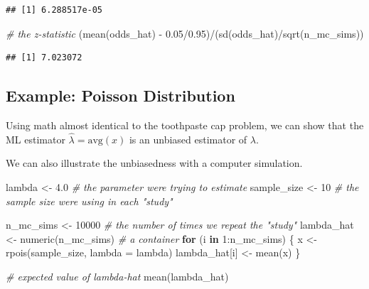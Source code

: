 \documentclass[
]{book}
\newenvironment{Shaded}{\begin{snugshade}}{\end{snugshade}}
\newcommand{\AttributeTok}[1]{\textcolor[rgb]{0.77,0.63,0.00}{#1}}
\newcommand{\CommentTok}[1]{\textcolor[rgb]{0.56,0.35,0.01}{\textit{#1}}}
\newcommand{\ControlFlowTok}[1]{\textcolor[rgb]{0.13,0.29,0.53}{\textbf{#1}}}
\newcommand{\DecValTok}[1]{\textcolor[rgb]{0.00,0.00,0.81}{#1}}
\newcommand{\FloatTok}[1]{\textcolor[rgb]{0.00,0.00,0.81}{#1}}
\newcommand{\FunctionTok}[1]{\textcolor[rgb]{0.00,0.00,0.00}{#1}}
\newcommand{\NormalTok}[1]{#1}
\newcommand{\OtherTok}[1]{\textcolor[rgb]{0.56,0.35,0.01}{#1}}
\newcommand{\SpecialCharTok}[1]{\textcolor[rgb]{0.00,0.00,0.00}{#1}}
\begin{document}
\begin{verbatim}
## [1] 6.288517e-05
\end{verbatim}

\begin{Shaded}
\begin{Highlighting}[]
\CommentTok{\# the z{-}statistic}
\NormalTok{(}\FunctionTok{mean}\NormalTok{(odds\_hat) }\SpecialCharTok{{-}} \FloatTok{0.05}\SpecialCharTok{/}\FloatTok{0.95}\NormalTok{)}\SpecialCharTok{/}\NormalTok{(}\FunctionTok{sd}\NormalTok{(odds\_hat)}\SpecialCharTok{/}\FunctionTok{sqrt}\NormalTok{(n\_mc\_sims))}
\end{Highlighting}
\end{Shaded}

\begin{verbatim}
## [1] 7.023072
\end{verbatim}

\hypertarget{example-poisson-distribution-1}{%
\subsection{Example: Poisson
Distribution}\label{example-poisson-distribution-1}}

Using math almost identical to the toothpaste cap problem, we can show
that the ML estimator \(\hat{\lambda} = \text{avg}(x)\) is an unbiased
estimator of \(\lambda\).

We can also illustrate the unbiasedness with a computer simulation.

\begin{Shaded}
\begin{Highlighting}[]
\NormalTok{lambda }\OtherTok{\textless{}{-}} \FloatTok{4.0}      \CommentTok{\# the parameter we\textquotesingle{}re trying to estimate}
\NormalTok{sample\_size }\OtherTok{\textless{}{-}} \DecValTok{10}  \CommentTok{\# the sample size we\textquotesingle{}re using in each "study"}

\NormalTok{n\_mc\_sims }\OtherTok{\textless{}{-}} \DecValTok{10000}  \CommentTok{\# the number of times we repeat the "study"}
\NormalTok{lambda\_hat }\OtherTok{\textless{}{-}} \FunctionTok{numeric}\NormalTok{(n\_mc\_sims)  }\CommentTok{\# a container }
\ControlFlowTok{for}\NormalTok{ (i }\ControlFlowTok{in} \DecValTok{1}\SpecialCharTok{:}\NormalTok{n\_mc\_sims) \{}
\NormalTok{  x }\OtherTok{\textless{}{-}} \FunctionTok{rpois}\NormalTok{(sample\_size, }\AttributeTok{lambda =}\NormalTok{ lambda)}
\NormalTok{  lambda\_hat[i] }\OtherTok{\textless{}{-}} \FunctionTok{mean}\NormalTok{(x)}
\NormalTok{\}}

\CommentTok{\# expected value of lambda{-}hat}
\FunctionTok{mean}\NormalTok{(lambda\_hat)}
\end{Highlighting}
\end{Shaded}
\end{document}

